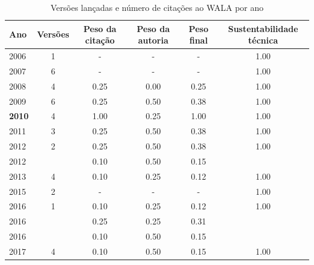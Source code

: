 \begin{table}[H]
\caption{Versões lançadas e número de citações ao WALA por ano}
\centering
\begin{tabular}{| l | c | c | c | c | c |}
  \hline
  Ano & Versões & Peso da citação & Peso da autoria & Peso final & Sustentabilidade técnica \\
  \hline
        2006 & 1 & - & - & -
        &
          {\color{blue} 1.00}
        \\
\hline
        2007 & 6 & - & - & -
        &
          {\color{blue} 1.00}
        \\
\hline
            2008
          &
          4
          &
          0.25
          &
          0.00
          &
          0.25
          &
            {\color{blue} 1.00}
          \\
\hline
            2009
          &
          6
          &
          0.25
          &
          0.50
          &
          0.38
          &
            {\color{blue} 1.00}
          \\
\hline
            {\bf 2010}
          &
          4
          &
          1.00
          &
          0.25
          &
          1.00
          &
            {\color{blue} 1.00}
          \\
\hline
            2011
          &
          3
          &
          0.25
          &
          0.50
          &
          0.38
          &
            {\color{blue} 1.00}
          \\
\hline
            2012
          &
          2
          &
          0.25
          &
          0.50
          &
          0.38
          &
            {\color{blue} 1.00}
          \\
            2012
          &
          
          &
          0.10
          &
          0.50
          &
          0.15
          &
          \\
\hline
            2013
          &
          4
          &
          0.10
          &
          0.25
          &
          0.12
          &
            {\color{blue} 1.00}
          \\
\hline
        2015 & 2 & - & - & -
        &
          {\color{blue} 1.00}
        \\
\hline
            2016
          &
          1
          &
          0.10
          &
          0.25
          &
          0.12
          &
            {\color{blue} 1.00}
          \\
            2016
          &
          
          &
          0.25
          &
          0.25
          &
          0.31
          &
          \\
            2016
          &
          
          &
          0.10
          &
          0.50
          &
          0.15
          &
          \\
\hline
            2017
          &
          4
          &
          0.10
          &
          0.50
          &
          0.15
          &
            {\color{blue} 1.00}
          \\
\hline
\end{tabular}
\end{table}

